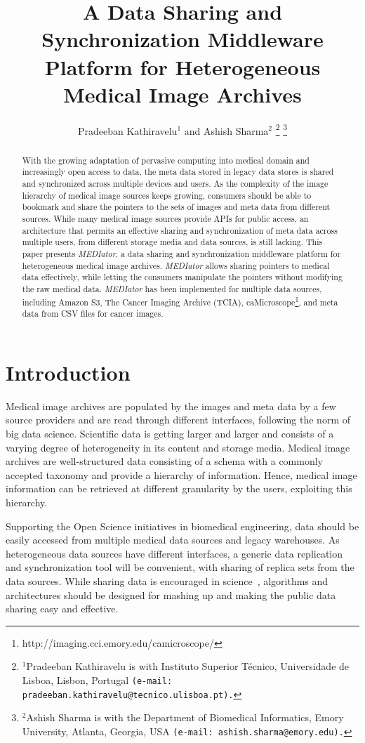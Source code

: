 \documentclass[letterpaper, 10 pt, conference]{ieeeconf}  %
\title{\LARGE \bf
	A Data Sharing and Synchronization Middleware Platform for Heterogeneous Medical Image Archives}
\author{Pradeeban Kathiravelu$^{1}$ and Ashish Sharma$^{2}$%
	\thanks{$^{1}$Pradeeban Kathiravelu is with Instituto Superior T\'{e}cnico, Universidade de Lisboa, Lisbon, Portugal
		{\tt\small (e-mail: pradeeban.kathiravelu@tecnico.ulisboa.pt).}}%
	\thanks{$^{2}$Ashish Sharma is with the Department of Biomedical Informatics, Emory University,
		Atlanta, Georgia, USA
		{\tt\small (e-mail: ashish.sharma@emory.edu).}}%
}
\begin{document}
	
	\maketitle
	\thispagestyle{empty}
	\pagestyle{empty}
	
\begin{abstract}
With the growing adaptation of pervasive computing into medical domain and increasingly open access to data, the meta data stored in legacy data stores is shared and synchronized across multiple devices and users. As the complexity of the image hierarchy of medical image sources keeps growing, consumers should be able to bookmark and share the pointers to the sets of images and meta data from different sources. While many medical image sources provide APIs for public access, an architecture that permits an effective sharing and synchronization of meta data across multiple users, from different storage media and data sources, is still lacking. This paper presents \textit{MEDIator}, a data sharing and synchronization middleware platform for heterogeneous medical image archives. \textit{MEDIator} allows sharing pointers to medical data effectively, while letting the consumers manipulate the pointers without modifying the raw medical data. \textit{MEDIator} has been implemented for multiple data sources, including Amazon S3, The Cancer Imaging Archive (TCIA), caMicroscope\footnote{http://imaging.cci.emory.edu/camicroscope/}, and meta data from CSV files for cancer images.
\end{abstract}



\section{Introduction}
Medical image archives are populated by the images and meta data by a few source providers and are read through different interfaces, following the norm of big data science. Scientific data is getting larger and larger and consists of a varying degree of heterogeneity in its content and storage media. Medical image archives are well-structured data consisting of a schema with a commonly accepted taxonomy and provide a hierarchy of information. Hence, medical image information can be retrieved at different granularity by the users, exploiting this hierarchy.

Supporting the Open Science initiatives in biomedical engineering, data should be easily accessed from multiple medical data sources and legacy warehouses. As heterogeneous data sources have different interfaces, a generic data replication and synchronization tool will be convenient, with sharing of replica sets from the data sources. While sharing data is encouraged in science~\cite{szala2006science}, algorithms and architectures should be designed for mashing up and making the public data sharing easy and effective. 
\end{document}
